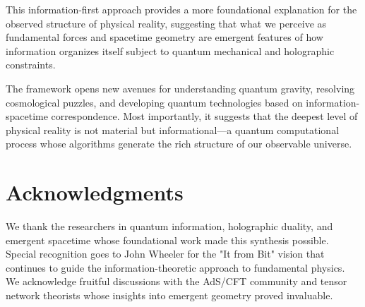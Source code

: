 \documentclass{article}
\begin{document}
This information-first approach provides a more foundational explanation for the observed structure of physical reality, suggesting that what we perceive as fundamental forces and spacetime geometry are emergent features of how information organizes itself subject to quantum mechanical and holographic constraints.

The framework opens new avenues for understanding quantum gravity, resolving cosmological puzzles, and developing quantum technologies based on information-spacetime correspondence. Most importantly, it suggests that the deepest level of physical reality is not material but informational—a quantum computational process whose algorithms generate the rich structure of our observable universe.

\section*{Acknowledgments}

We thank the researchers in quantum information, holographic duality, and emergent spacetime whose foundational work made this synthesis possible. Special recognition goes to John Wheeler for the "It from Bit" vision that continues to guide the information-theoretic approach to fundamental physics. We acknowledge fruitful discussions with the AdS/CFT community and tensor network theorists whose insights into emergent geometry proved invaluable.
\end{document}
